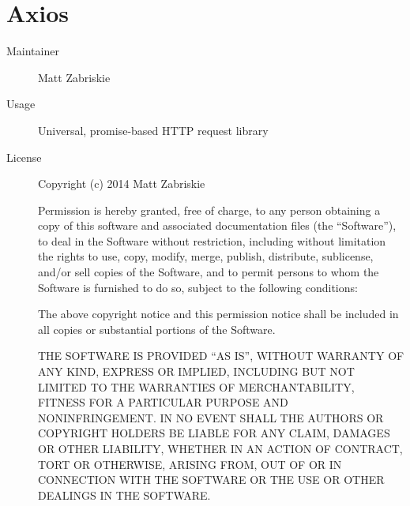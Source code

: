   \section*{Axios}
    \begin{description}
      \item[Maintainer] Matt Zabriskie
      \item[Usage] Universal, promise-based HTTP request library
      \item[License] \scriptsize Copyright (c) 2014 Matt Zabriskie

        Permission is hereby granted, free of charge, to any person obtaining a copy
        of this software and associated documentation files (the ``Software''), to deal
        in the Software without restriction, including without limitation the rights
        to use, copy, modify, merge, publish, distribute, sublicense, and/or sell
        copies of the Software, and to permit persons to whom the Software is
        furnished to do so, subject to the following conditions:

        The above copyright notice and this permission notice shall be included in
        all copies or substantial portions of the Software.

        THE SOFTWARE IS PROVIDED ``AS IS'', WITHOUT WARRANTY OF ANY KIND, EXPRESS OR
        IMPLIED, INCLUDING BUT NOT LIMITED TO THE WARRANTIES OF MERCHANTABILITY,
        FITNESS FOR A PARTICULAR PURPOSE AND NONINFRINGEMENT. IN NO EVENT SHALL THE
        AUTHORS OR COPYRIGHT HOLDERS BE LIABLE FOR ANY CLAIM, DAMAGES OR OTHER
        LIABILITY, WHETHER IN AN ACTION OF CONTRACT, TORT OR OTHERWISE, ARISING FROM,
        OUT OF OR IN CONNECTION WITH THE SOFTWARE OR THE USE OR OTHER DEALINGS IN
        THE SOFTWARE.
    \end{description}

